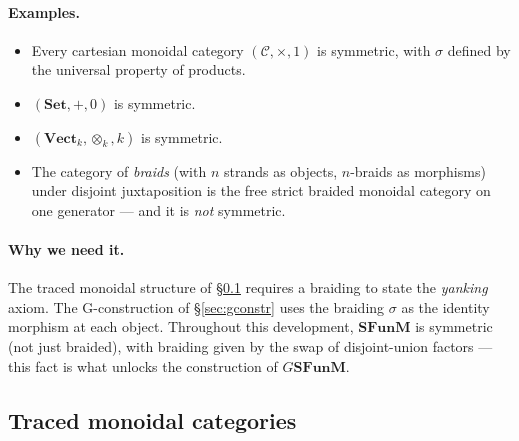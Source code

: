 \documentclass[11pt]{article}
\newcommand{\SFunM}{\mathbf{SFunM}}
\begin{document}
\paragraph{Examples.}
\begin{itemize}
  \item Every cartesian monoidal category $(\mathcal{C}, \times, 1)$
        is symmetric, with $\sigma$ defined by the universal property
        of products.
  \item $(\mathbf{Set}, +, 0)$ is symmetric.
  \item $(\mathbf{Vect}_k, \otimes_k, k)$ is symmetric.
  \item The category of \emph{braids} (with $n$ strands as objects,
        $n$-braids as morphisms) under disjoint juxtaposition is the
        free strict braided monoidal category on one generator ---
        and it is \emph{not} symmetric.
\end{itemize}

\paragraph{Why we need it.}
The traced monoidal structure of \S\ref{sec:traced} requires a
braiding to state the \emph{yanking} axiom.  The G-construction of
\S\ref{sec:gconstr} uses the braiding $\sigma$ as the identity
morphism at each object.  Throughout this development, $\SFunM$ is
symmetric (not just braided), with braiding given by the swap of
disjoint-union factors --- this fact is what unlocks the construction
of $G\SFunM$.

\subsection{Traced monoidal categories}
\label{sec:traced}
\end{document}
